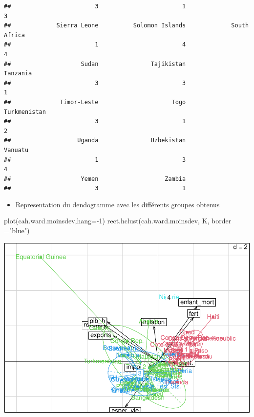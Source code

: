 \documentclass[
]{article}
\newenvironment{Shaded}{}{}
\newcommand{\AttributeTok}[1]{#1}
\newcommand{\DecValTok}[1]{#1}
\newcommand{\FunctionTok}[1]{#1}
\newcommand{\NormalTok}[1]{#1}
\newcommand{\SpecialCharTok}[1]{\textcolor[rgb]{0.00,0.50,0.50}{#1}}
\newcommand{\StringTok}[1]{\textcolor[rgb]{0.00,0.50,0.50}{#1}}
\providecommand{\tightlist}{%
  \setlength{\itemsep}{0pt}\setlength{\parskip}{0pt}}
\begin{document}
\begin{verbatim}
##                        3                        1                        3 
##             Sierra Leone          Solomon Islands             South Africa 
##                        1                        4                        4 
##                    Sudan               Tajikistan                 Tanzania 
##                        3                        3                        1 
##              Timor-Leste                     Togo             Turkmenistan 
##                        3                        1                        2 
##                   Uganda               Uzbekistan                  Vanuatu 
##                        1                        3                        4 
##                    Yemen                   Zambia 
##                        3                        1
\end{verbatim}

\begin{itemize}
\tightlist
\item
  Representation du dendogramme avec les différents groupes obtenus
\end{itemize}

\begin{Shaded}
\begin{Highlighting}[]
\FunctionTok{plot}\NormalTok{(cah.ward.moinsdev,}\AttributeTok{hang=}\SpecialCharTok{{-}}\DecValTok{1}\NormalTok{)}
\FunctionTok{rect.hclust}\NormalTok{(cah.ward.moinsdev, K, }\AttributeTok{border =}\StringTok{"blue"}\NormalTok{)}
\end{Highlighting}
\end{Shaded}

\includegraphics{Projet_files/figure-latex/unnamed-chunk-37-1.pdf}
\end{document}

